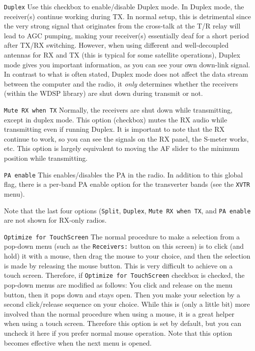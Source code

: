 \documentclass[12pt]{book}
\def\rett#1{\texttt{\color{red}#1}}
\def\bltt#1{\texttt{\color{blue}#1}}
\begin{document}
\rett{Duplex} Use this checkbox to enable/disable Duplex mode. In Duplex mode, the receiver(s)
continue working during TX. In normal setup, this is detrimental since the very strong
signal that originates from the cross-talk at the T/R relay will lead to AGC pumping,
making your receiver(s) essentially deaf for a short period after TX/RX switching.
However, when using different and well-decoupled antennas for RX and TX (this is typical
for some satellite operations), Duplex mode gives you important information, as you can
see your own down-link signal. In contrast to what is often stated, Duplex mode does not
affect the data stream between the computer and the radio, it \textit{only} determines
whether the receivers (within the WDSP library) are shut down during transmit or not.

\rett{Mute RX when TX} Normally, the receivers are shut down while transmitting, except
in duplex mode. This option (checkbox) mutes the RX audio while transmitting even if running
Duplex. It is important
to note that the RX continue to work, so you can see the signals on the RX panel, the
S-meter works, etc. This option is largely equivalent to moving the AF slider to the
minimum position while transmitting.

\rett{PA enable} This enables/disables the PA in the radio. In addition to this global
flag, there is a per-band PA enable option for the transverter bands (see the \bltt{XVTR}
menu).

Note that the last four options (\rett{Split}, \rett{Duplex}, \rett{Mute RX when TX},
and \rett{PA enable} are not shown for RX-only radios.

\rett{Optimize for TouchScreen} The normal procedure to make a selection from a
pop-down menu (such as the \rett{Receivers:} button on this screen) is to click
(and hold) it with a mouse, then drag the mouse to your choice, and then the selection
is made by releasing the mouse button. This is very difficult to achieve on a touch
screen. Therefore, if \rett{Optimize for TouchScreen} checkbox is checked, the pop-down
menus are modified as follows: You click and release on the menu button, then it pops
down and stays open. Then you make your selection by a second click/release sequence
on your choice. While this is (only a little bit) more involved than the normal procedure
when using a mouse, it is a great helper when using a touch screen. Therefore this
option is set by default, but you can uncheck it here if you prefer normal
mouse operation. Note that this option becomes effective when the next menu is opened.
\end{document}
